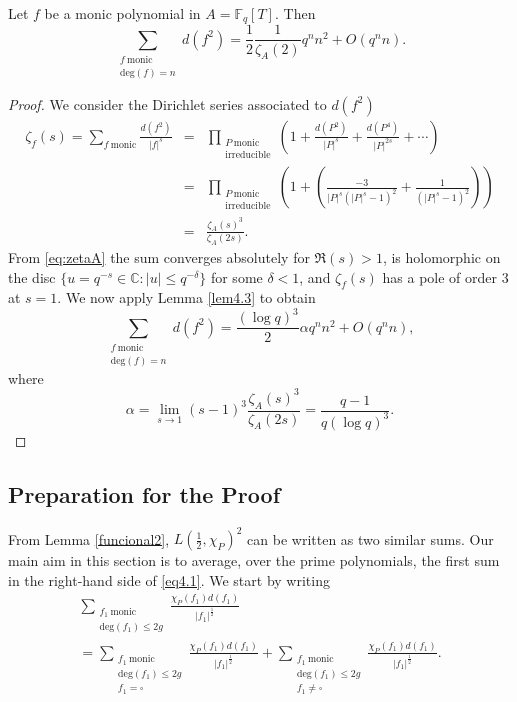 \documentclass[11pt]{amsart}
\begin{document}
\begin{lem}
Let $f$ be a monic polynomial in $A=\mathbb{F}_{q}[T]$. Then
\begin{equation}
\sum_{\substack{f \ \mathrm{monic} \\ \mathrm{deg}(f)=n}}d(f^{2})=\frac{1}{2}\frac{1}{\zeta_{A}(2)}q^{n}n^{2}+O(q^{n}n).
\end{equation}
\end{lem}
\begin{proof}
We consider the Dirichlet series associated to $d(f^{2})$
\begin{eqnarray}
\zeta_{f}(s)=\sum_{f \ \mathrm{monic}}\frac{d(f^{2})}{|f|^{s}}&=&\prod_{\substack{P \ \mathrm{monic} \\ \mathrm{irreducible}}}\left(1+\frac{d(P^{2})}{|P|^{s}}+\frac{d(P^{4})}{|P|^{2s}}+\cdots\right)\nonumber\\
&=&\prod_{\substack{P \ \mathrm{monic} \\ \mathrm{irreducible}}}\left(1+\left(\frac{-3}{|P|^{s}(|P|^{s}-1)^{2}}+\frac{1}{(|P|^{s}-1)^{2}}\right)\right)\nonumber\\
&=&\frac{\zeta_{A}(s)^{3}}{\zeta_{A}(2s)}.\nonumber
\end{eqnarray}
From \eqref{eq:zetaA} the sum converges absolutely for $\mathfrak{R}(s)>1$, is holomorphic on the disc $\{u=q^{-s}\in\mathbb{C}:|u|\leq q^{-\delta}\}$ for some $\delta<1$, and $\zeta_{f}(s)$ has a pole of order $3$ at $s=1$. We now apply Lemma \ref{lem4.3} to obtain
\begin{equation}
\sum_{\substack{f \ \mathrm{monic} \\ \mathrm{deg}(f)=n}}d(f^{2})=\frac{(\log q)^{3}}{2}\alpha q^{n}n^{2}+O(q^{n}n),
\end{equation}
where
\begin{equation}
\alpha=\lim_{s\rightarrow1}(s-1)^{3}\frac{\zeta_{A}(s)^{3}}{\zeta_{A}(2s)}=\frac{q-1}{q(\log q)^{3}}.
\end{equation}
\end{proof}

\subsection{Preparation for the Proof}

From Lemma \ref{funcional2}, $L(\tfrac{1}{2},\chi_{P})^{2}$ can be written as two similar sums. Our main aim in this section is to average, over the prime polynomials, the first sum in the right-hand side of \eqref{eq4.1}. We start by writing
\begin{multline}
\sum_{\substack{f_{1} \ \mathrm{monic} \\ \mathrm{deg}(f_{1})\leq2g}}\frac{\chi_{P}(f_{1})d(f_{1})}{|f_{1}|^{\tfrac{1}{2}}}\\
=\sum_{\substack{f_{1} \ \mathrm{monic} \\ \mathrm{deg}(f_{1})\leq2g \\ f_{1}=\square}}\frac{\chi_{P}(f_{1})d(f_{1})}{|f_{1}|^{\tfrac{1}{2}}}+\sum_{\substack{f_{1} \ \mathrm{monic} \\ \mathrm{deg}(f_{1})\leq2g \\ f_{1}\neq\square}}\frac{\chi_{P}(f_{1})d(f_{1})}{|f_{1}|^{\tfrac{1}{2}}}.
\end{multline}
\end{document}
